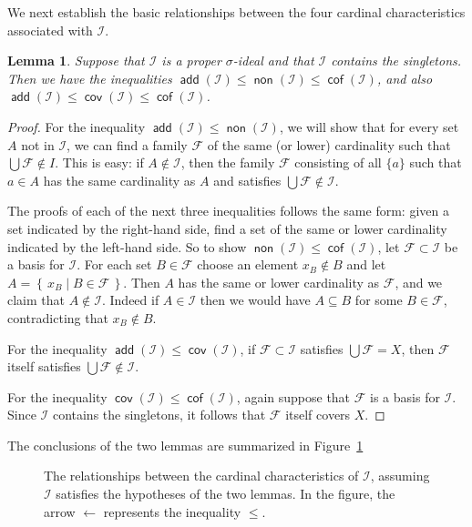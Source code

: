 \documentclass[11pt,oneside]{amsbook}
\newcommand{\set}[1]{\left\{\,#1\,\right\}}
\DeclareMathOperator{\add}{\mathsf{add}}
\DeclareMathOperator{\non}{\mathsf{non}}
\DeclareMathOperator{\cov}{\mathsf{cov}}
\DeclareMathOperator{\cof}{\mathsf{cof}}
\theoremstyle{definition}
\theoremstyle{plain}
\newtheorem{lemma}[theorem]{Lemma}
\theoremstyle{definition}
\theoremstyle{remark}
\numberwithin{equation}{section}
\numberwithin{figure}{section}
\begin{document}
We next establish the basic relationships between the four cardinal characteristics associated with $\mathcal I$.

\begin{lemma}
  \label{lem:diamond}
  Suppose that $\mathcal I$ is a proper $\sigma$-ideal and that $\mathcal I$ contains the singletons. Then we have the inequalities $\add(\mathcal I)\leq\non(\mathcal I)\leq\cof(\mathcal I)$, and also $\add(\mathcal I)\leq\cov(\mathcal I)\leq\cof(\mathcal I)$.
\end{lemma}

\begin{proof}
  For the inequality $\add(\mathcal{I})\leq\non(\mathcal{I})$, we will show that for every set $A$ not in $\mathcal I$, we can find a family $\mathcal F$ of the same (or lower) cardinality such that $\bigcup\mathcal F\notin I$. This is easy: if $A\notin\mathcal I$, then the family $\mathcal F$ consisting of all $\{a\}$ such that $a\in A$ has the same cardinality as $A$ and satisfies $\bigcup\mathcal F\notin\mathcal I$.

  The proofs of each of the next three inequalities follows the same form: given a set indicated by the right-hand side, find a set of the same or lower cardinality indicated by the left-hand side. So to show $\non(\mathcal I)\leq\cof(\mathcal I)$, let $\mathcal F\subset \mathcal{I}$ be a basis for $\mathcal I$. For each set $B\in\mathcal F$ choose an element $x_B\notin B$ and let $A=\set{x_B\mid B\in\mathcal F}$. Then $A$ has the same or lower cardinality as $\mathcal F$, and we claim that $A\notin\mathcal{I}$. Indeed if $A\in\mathcal{I}$ then we would have $A\subseteq B$ for some $B\in\mathcal F$, contradicting that $x_B\notin B$.

  For the inequality $\add(\mathcal I)\leq\cov(\mathcal I)$, if $\mathcal F\subset\mathcal{I}$ satisfies $\bigcup\mathcal F=X$, then $\mathcal F$ itself satisfies $\bigcup\mathcal F\notin\mathcal I$.

  For the inequality $\cov(\mathcal I)\leq\cof(\mathcal I)$, again suppose that $\mathcal F$ is a basis for $\mathcal I$. Since $\mathcal I$ contains the singletons, it follows that $\mathcal F$ itself covers $X$.
\end{proof}

The conclusions of the two lemmas are summarized in Figure~\ref{fig:ideal}

\begin{figure}[h]
  \caption{The relationships between the cardinal characteristics of $\mathcal I$, assuming $\mathcal I$ satisfies the hypotheses of the two lemmas. In the figure, the arrow $\leftarrow$ represents the inequality $\leq$.\label{fig:ideal}}
\end{figure}
\end{document}
